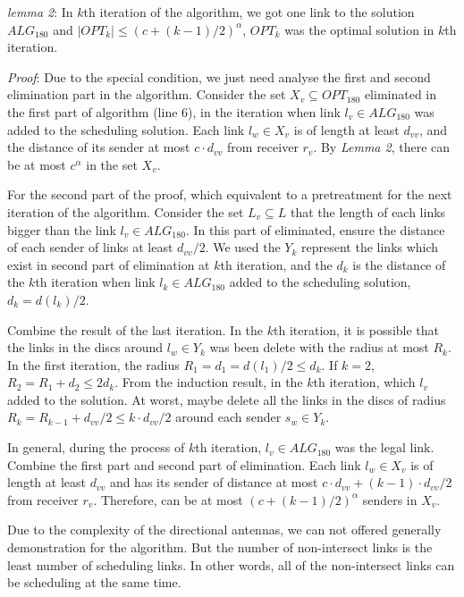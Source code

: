 \documentclass[conference]{IEEEtran}
\begin{document}
\emph{lemma 2}: In $k$th iteration of the algorithm, we got one link to the solution $ALG_{180}$ and $|OPT_k| \leq (c+(k-1)/2)^{\alpha}$, $OPT_k$ was the optimal solution in $k$th iteration.


\emph{Proof}: Due to the special condition, we just need analyse the first and second elimination part in the algorithm. Consider the set $X_v \subseteq OPT_{180}$ eliminated in the first part of algorithm (line 6), in the iteration when link $l_v \in ALG_{180}$ was added to the scheduling solution. Each link $l_w \in X_v$ is of length at least $d_{vv}$, and the distance of its sender at most $c \cdot d_{vv}$ from receiver $r_v$. By \emph{Lemma 2}, there can be at most $c^{\alpha}$ in the set $X_v$.

For the second part of the proof, which equivalent to a pretreatment for the next iteration of the algorithm. Consider the set $L_v \subseteq L$ that the length of each links bigger than the link $l_v \in ALG_{180}$. In this part of eliminated, ensure the distance of each sender of links at least $d_{vv}/2$. We used the $Y_k$ represent the links which exist in second part of elimination at $k$th iteration, and the $d_k$ is the distance of the $k$th iteration when link $l_k \in ALG_{180}$ added to the scheduling solution, $d_k= d(l_k)/2$.

Combine the result of the last iteration. In the $k$th iteration, it is possible that the links in the discs around $l_w \in Y_k$ was been delete with the radius at most $R_k$. In the first iteration, the radius $R_1 = d_1= d(l_1)/2 \leq d_k$. If $k=2$, $R_2= R_1+ d_2 \leq 2 d_k$. From the induction result, in the $k$th iteration, which $l_v$ added to the solution. At worst, maybe delete all the links in the discs of radius $R_k=R_{k-1} + d_{vv}/2 \leq k \cdot d_{vv}/2$ around each sender $s_w \in Y_k$.

In general, during the process of $k$th iteration, $l_v \in ALG_{180}$ was the legal link. Combine the first part and second part of elimination. Each link $l_w \in X_v$ is of length at least $d_{vv}$ and has its sender of distance at most $c \cdot d_{vv} + (k-1) \cdot d_{vv}/2$ from receiver $r_v$. Therefore, can be at most $(c+(k-1)/2)^{\alpha}$ senders in $X_v$.

Due to the complexity of the directional antennas, we can not offered generally demonstration for the algorithm. But the number of non-intersect links is the least number of scheduling links. In other words, all of the non-intersect links can be scheduling at the same time.
\end{document}
